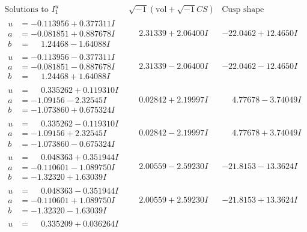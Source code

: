 \documentclass[1p]{elsarticle_modified}
\theoremstyle{definition}
\newcommand{\I}{\sqrt{-1}}
\begin{document}
$$\begin{array}{c|c|c}
\text{Solutions to }I^u_{1}& \I (\text{vol} + \sqrt{-1}CS) & \text{Cusp shape}\\
 \hline 
\begin{aligned}
u &= -0.113956 + 0.377311 I \\
a &= -0.081851 + 0.887678 I \\
b &= \phantom{-}1.24468 - 1.64088 I\end{aligned}
 & \phantom{-}2.31339 + 2.06400 I & -22.0462 + 12.4650 I \\ \hline\begin{aligned}
u &= -0.113956 - 0.377311 I \\
a &= -0.081851 - 0.887678 I \\
b &= \phantom{-}1.24468 + 1.64088 I\end{aligned}
 & \phantom{-}2.31339 - 2.06400 I & -22.0462 - 12.4650 I \\ \hline\begin{aligned}
u &= \phantom{-}0.335262 + 0.119310 I \\
a &= -1.09156 - 2.32545 I \\
b &= -1.073860 + 0.675324 I\end{aligned}
 & \phantom{-}0.02842 + 2.19997 I & \phantom{-}4.77678 - 3.74049 I \\ \hline\begin{aligned}
u &= \phantom{-}0.335262 - 0.119310 I \\
a &= -1.09156 + 2.32545 I \\
b &= -1.073860 - 0.675324 I\end{aligned}
 & \phantom{-}0.02842 - 2.19997 I & \phantom{-}4.77678 + 3.74049 I \\ \hline\begin{aligned}
u &= \phantom{-}0.048363 + 0.351944 I \\
a &= -0.110601 - 1.089750 I \\
b &= -1.32320 + 1.63039 I\end{aligned}
 & \phantom{-}2.00559 - 2.59230 I & -21.8153 - 13.3624 I \\ \hline\begin{aligned}
u &= \phantom{-}0.048363 - 0.351944 I \\
a &= -0.110601 + 1.089750 I \\
b &= -1.32320 - 1.63039 I\end{aligned}
 & \phantom{-}2.00559 + 2.59230 I & -21.8153 + 13.3624 I \\ \hline\begin{aligned}
u &= \phantom{-}0.335209 + 0.036264 I \\

\end{aligned}
\end{array}$$
\end{document}

